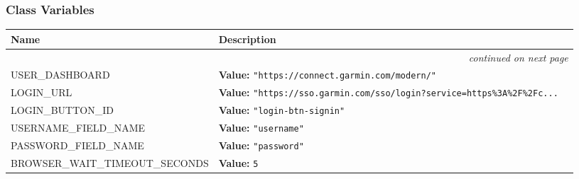 
  \subsubsection{Class Variables}

    \vspace{-1cm}
\hspace{\varindent}\begin{longtable}{|p{\varnamewidth}|p{\vardescrwidth}|l}
\cline{1-2}
\cline{1-2} \centering \textbf{Name} & \centering \textbf{Description}& \\
\cline{1-2}
\endhead\cline{1-2}\multicolumn{3}{r}{\small\textit{continued on next page}}\\\endfoot\cline{1-2}
\endlastfoot\raggedright U\-S\-E\-R\-\_\-D\-A\-S\-H\-B\-O\-A\-R\-D\- & \raggedright \textbf{Value:} 
{\tt "https://connect.garmin.com/modern/"}&\\
\cline{1-2}
\raggedright L\-O\-G\-I\-N\-\_\-U\-R\-L\- & \raggedright \textbf{Value:} 
{\tt "https://sso.garmin.com/sso/login?service=https\%3A\%2F\%2Fc\texttt{...}}&\\
\cline{1-2}
\raggedright L\-O\-G\-I\-N\-\_\-B\-U\-T\-T\-O\-N\-\_\-I\-D\- & \raggedright \textbf{Value:} 
{\tt "login-btn-signin"}&\\
\cline{1-2}
\raggedright U\-S\-E\-R\-N\-A\-M\-E\-\_\-F\-I\-E\-L\-D\-\_\-N\-A\-M\-E\- & \raggedright \textbf{Value:} 
{\tt "username"}&\\
\cline{1-2}
\raggedright P\-A\-S\-S\-W\-O\-R\-D\-\_\-F\-I\-E\-L\-D\-\_\-N\-A\-M\-E\- & \raggedright \textbf{Value:} 
{\tt "password"}&\\
\cline{1-2}
\raggedright B\-R\-O\-W\-S\-E\-R\-\_\-W\-A\-I\-T\-\_\-T\-I\-M\-E\-O\-U\-T\-\_\-S\-E\-C\-O\-N\-D\-S\- & \raggedright \textbf{Value:} 
{\tt 5}&\\
\cline{1-2}
\end{longtable}

